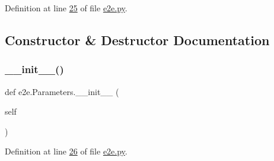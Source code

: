 Definition at line \hyperlink{e2e_8py_source_l00025}{25} of file \hyperlink{e2e_8py_source}{e2e.\+py}.



\subsection{Constructor \& Destructor Documentation}
\mbox{\label{classe2e_1_1_parameters_a335faddfa9af3ed8ac441e92faec0946}} 
\subsubsection{\texorpdfstring{\+\_\+\+\_\+init\+\_\+\+\_\+()}{\_\_init\_\_()}}
{\footnotesize\ttfamily def e2e.\+Parameters.\+\_\+\+\_\+init\+\_\+\+\_\+ (\begin{DoxyParamCaption}\item[{}]{self }\end{DoxyParamCaption})}



Definition at line \hyperlink{e2e_8py_source_l00026}{26} of file \hyperlink{e2e_8py_source}{e2e.\+py}.


